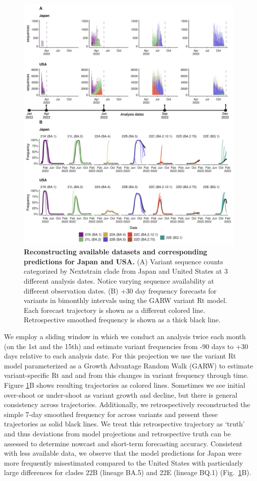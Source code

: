 \documentclass[11pt,oneside,letterpaper]{article}
\begin{document}
\begin{figure}[tb!]
	\centering
	\includegraphics[width=0.9\textwidth=0.01]{figures/Dynamic_est_env.png}
	\caption{
		\textbf{Reconstructing available datasets and corresponding predictions for Japan and USA.}
		(A) Variant sequence counts categorized by Nextstrain clade from Japan and United States at 3 different analysis dates.
		Notice varying sequence availability at different observation dates.
		(B) +30 day frequency forecasts for variants in bimonthly intervals using the GARW variant Rt model.
		Each forecast trajectory is shown as a different colored line.
		Retrospective smoothed frequency is shown as a thick black line.
	}
	\label{fig:dynamic_forecast_env}
\end{figure}

We employ a sliding window in which we conduct an analysis twice each month (on the 1st and the 15th) and estimate variant frequencies from -90 days to +30 days relative to each analysis date.
For this projection we use the variant Rt model \cite{figgins2022sars} parameterized as a Growth Advantage Random Walk (GARW) to estimate variant-specific Rt and and from this changes in variant frequency through time.
Figure \ref{fig:dynamic_forecast_env}B shows resulting trajectories as colored lines.
Sometimes we see initial over-shoot or under-shoot as variant growth and decline, but there is general consistency across trajectories.
Additionally, we retrospectively reconstructed the simple 7-day smoothed frequency for across variants and present these trajectories as solid black lines.
We treat this retrospective trajectory as `truth' and thus deviations from model projections and retrospective truth can be assessed to determine nowcast and short-term forecasting accuracy.
Consistent with less available data, we observe that the model predictions for Japan were more frequently misestimated compared to the United States with particularly large differences for clades 22B (lineage BA.5) and 22E (lineage BQ.1) (Fig.~\ref{fig:dynamic_forecast_env}B).
\end{document}
